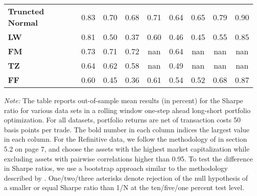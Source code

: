 \begin{table}[p]
{\begin{tabularx}{\textwidth}{Xcccccccc}
\textbf{Truncted Normal} & \cellcolor{gray!40}0.83 & \cellcolor{gray!27}0.70 & \cellcolor{gray!27}0.68 & \cellcolor{gray!36}0.71 & \cellcolor{gray!31}0.64 & \cellcolor{gray!36}0.65 & \cellcolor{gray!40}0.79 & \cellcolor{gray!40}0.90 \\
\textbf{LW} & \cellcolor{gray!36}0.81 & \cellcolor{gray!18}0.50 & \cellcolor{gray!9}0.37 & \cellcolor{gray!27}0.60 & \cellcolor{gray!4}0.46 & \cellcolor{gray!27}0.45 & \cellcolor{gray!27}0.55 & \cellcolor{gray!27}0.85 \\
\textbf{FM} & \cellcolor{gray!22}0.73 & \cellcolor{gray!36}0.71 & \cellcolor{gray!38}0.72 & \cellcolor{gray!0}nan & \cellcolor{gray!27}0.64 & \cellcolor{gray!0}nan & \cellcolor{gray!0}nan & \cellcolor{gray!0}nan \\
\textbf{TZ} & \cellcolor{gray!4}0.64 & \cellcolor{gray!22}0.62 & \cellcolor{gray!22}0.58 & \cellcolor{gray!0}nan & \cellcolor{gray!9}0.49 & \cellcolor{gray!0}nan & \cellcolor{gray!0}nan & \cellcolor{gray!0}nan \\
\textbf{FF} & \cellcolor{gray!0}0.60 & \cellcolor{gray!4}0.45 & \cellcolor{gray!4}0.36 & \cellcolor{gray!31}0.61 & \cellcolor{gray!22}0.54 & \cellcolor{gray!31}0.52 & \cellcolor{gray!31}0.68 & \cellcolor{gray!36}0.87 \\
\bottomrule
\end{tabularx}
\vspace{0.3em}
{\footnotesize \textit{Note:} The table reports out-of-sample mean results (in percent) for the Sharpe ratio for various data sets in a rolling window one-step ahead long-short portfolio optimization. For all datasets, portfolio returns are net of transaction costs 50 basis points per trade. The bold number in each column indices the largest value in each column. For the Refinitive data, we follow the methodology of \citet{denard2022} in section 5.2 on page 7, and choose the assets with the highest market capitalization while excluding assets with pairwise correlations higher than 0.95. To test the difference in Sharpe ratios, we use a bootstrap approach similar to the methodology described by \citet{ledoit2011}. One/two/three asterisks denote rejection of the null hypothesis of a smaller or equal Sharpe ratio than 1/N at the ten/five/one percent test level.}}
\end{table}